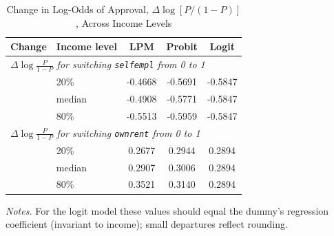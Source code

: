 \begin{table}[H]
\centering
\caption{Change in Log-Odds of Approval, $\Delta\log[P/(1-P)]$, Across Income Levels\label{tab:prob1-logodds}}
\begin{tabular}{l l ccc}
\toprule
Change & Income level & LPM & Probit & Logit \\
\midrule
\multicolumn{5}{l}{\emph{$\Delta\log\frac{P}{1-P}$ for switching \texttt{selfempl} from 0 to 1}} \\
 & 20\%  & -0.4668 & -0.5691 & -0.5847 \\
 & median  & -0.4908 & -0.5771 & -0.5847 \\
 & 80\%  & -0.5513 & -0.5959 & -0.5847 \\
\midrule
\multicolumn{5}{l}{\emph{$\Delta\log\frac{P}{1-P}$ for switching \texttt{ownrent} from 0 to 1}} \\
 & 20\%  &  0.2677 &  0.2944 &  0.2894 \\
 & median  &  0.2907 &  0.3006 &  0.2894 \\
 & 80\%  &  0.3521 &  0.3140 &  0.2894 \\
\midrule
\bottomrule
\end{tabular}
\parbox{0.9\textwidth}{\footnotesize \emph{Notes.} For the logit model these values should equal the dummy's regression coefficient (invariant to income); small departures reflect rounding.}
\end{table}
